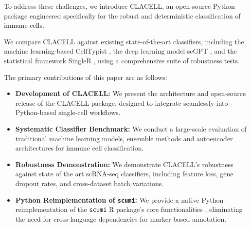 \documentclass[11pt]{article}
\begin{document}

To address these challenges, we introduce CLACELL, an open-source Python package engineered specifically for the robust and deterministic classification of immune cells.

We compare CLACELL against existing state-of-the-art classifiers, including the machine learning-based CellTypist \cite{dominguez_conde_cross-tissue_2022}, the deep learning model scGPT \cite{cui_scgpt_2024}, and the statistical framework SingleR \cite{aran_reference-based_2019}, using a comprehensive suite of robustness tests.

The primary contributions of this paper are as follows:
\begin{itemize}
    \item \textbf{Development of CLACELL:} We present the architecture and open-source release of the CLACELL package, designed to integrate seamlessly into Python-based single-cell workflows.
    \item \textbf{Systematic Classifier Benchmark:} We conduct a large-scale evaluation of traditional machine learning models, ensemble methods and autoencoder architectures for immune cell classification.
    \item \textbf{Robustness Demonstration:} We demonstrate CLACELL's robustness against state of the art scRNA-seq classifiers, including feature loss, gene dropout rates, and cross-dataset batch variations.
    \item \textbf{Python Reimplementation of \texttt{scumi}:} We provide a native Python reimplementation of the \texttt{scumi} R package's core functionalities \cite{ding_systematic_2020}, eliminating the need for cross-language dependencies for marker based annotation.
\end{itemize}
\end{document}

